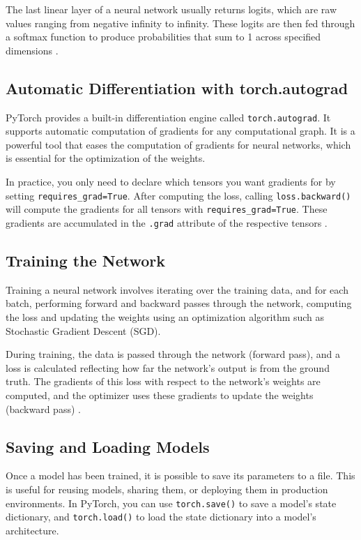 The last linear layer of a neural network usually returns logits, which are raw values ranging from negative infinity to infinity. These logits are then fed through a softmax function to produce probabilities that sum to 1 across specified dimensions \cite[Build Model]{pytorch_tutorial}.

\subsection{Automatic Differentiation with torch.autograd}

PyTorch provides a built-in differentiation engine called \verb|torch.autograd|. It supports automatic computation of gradients for any computational graph. It is a powerful tool that eases the computation of gradients for neural networks, which is essential for the optimization of the weights.

In practice, you only need to declare which tensors you want gradients for by setting \verb|requires_grad=True|. After computing the loss, calling \verb|loss.backward()| will compute the gradients for all tensors with \verb|requires_grad=True|. These gradients are accumulated in the \verb|.grad| attribute of the respective tensors \cite[Automatic Differentiation]{pytorch_tutorial}.

\subsection{Training the Network}

Training a neural network involves iterating over the training data, and for each batch, performing forward and backward passes through the network, computing the loss and updating the weights using an optimization algorithm such as Stochastic Gradient Descent (SGD).

During training, the data is passed through the network (forward pass), and a loss is calculated reflecting how far the network's output is from the ground truth. The gradients of this loss with respect to the network's weights are computed, and the optimizer uses these gradients to update the weights (backward pass) \cite[Optimization Loop]{pytorch_tutorial}.

\subsection{Saving and Loading Models}

Once a model has been trained, it is possible to save its parameters to a file. This is useful for reusing models, sharing them, or deploying them in production environments. In PyTorch, you can use \verb|torch.save()| to save a model's state dictionary, and \verb|torch.load()| to load the state dictionary into a model's architecture.

